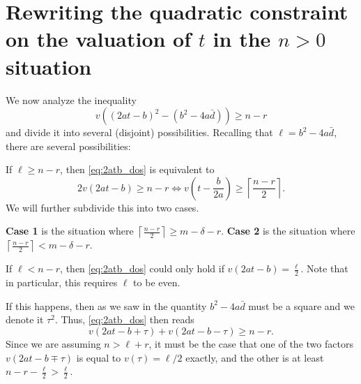 \section{Rewriting the quadratic constraint on the valuation of $t$ in the $n > 0$ situation}
We now analyze the inequality
\begin{equation}
  v\left( (2at-b)^2 - (b^2-4a\bar d) \right) \geq n-r
  \label{eq:2atb_dos}
\end{equation}
and divide it into several (disjoint) possibilities.
Recalling that $\ell = b^2 - 4 a \bar d$, there are several possibilities:
\begin{itemize}
  \ii If $\ell \ge n-r$, then \eqref{eq:2atb_dos} is equivalent to
  \begin{equation}
    2v(2at-b) \ge n-r
    \iff v\left( t - \frac{b}{2a} \right) \ge \left\lceil \frac{n-r}{2} \right\rceil.
    \label{eq:t_disk_case_1_2}
  \end{equation}
  We will further subdivide this into two cases.
  \begin{itemize}
    \ii \textbf{Case 1} is the situation where $\left\lceil \frac{n-r}{2} \right\rceil \ge m - \delta - r$.
    \ii \textbf{Case 2} is the situation where $\left\lceil \frac{n-r}{2} \right\rceil < m - \delta - r$.
  \end{itemize}

  \ii If $\ell < n-r$, then \eqref{eq:2atb_dos} could only hold if $v(2at-b) = \frac{\ell}{2}$.
  Note that in particular, this requires $\ell$ to be even.

  If this happens, then as we saw in 
  the quantity $b^2 - 4 a \bar d$ must be a square and we denote it $\tau^2$.
  Thus, \eqref{eq:2atb_dos} then reads
  \begin{equation}
    v(2at-b+\tau) + v(2at-b-\tau) \ge n-r.
    \label{eq:case_3_4_dos}
  \end{equation}
  Since we are assuming $n > \ell + r$,
  it must be the case that one of the two factors
  $v(2at-b\mp\tau)$ is equal to $v(\tau) = \ell / 2$ exactly,
  and the other is at least $n - r - \frac{\ell}{2} > \frac{\ell}{2}$.


\end{itemize}
